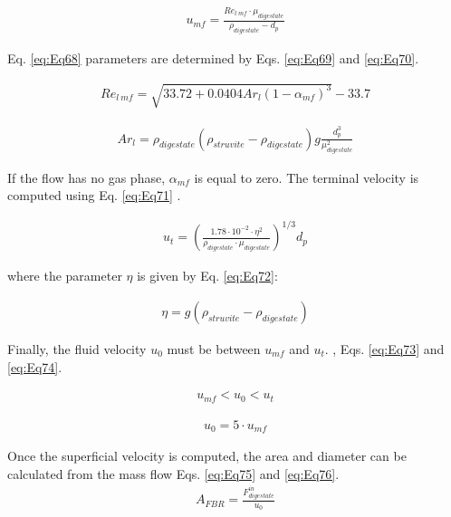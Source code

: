 \begin{refsection}[referencesCh2]
\begin{align}
	{u_{mf}} = \frac{Re_{l \ mf} \cdot {\mu_{digestate}}}{\rho_{digestate} - {d_p}} \label{eq:Eq68}
\end{align}

Eq. \ref{eq:Eq68} parameters are determined by Eqs. \ref{eq:Eq69} and \ref{eq:Eq70}.

\begin{align}
	Re_{l \ mf} = \sqrt {33.72 + 0.0404Ar_{l}{\left( {1 - {\alpha_{mf}}} \right)^3}} - 33.7 \label{eq:Eq69}
\end{align}

\begin{align}
	Ar_{l} = \rho_{digestate} \left( {\rho_{struvite} - {\rho _{digestate}}} \right) g \frac{d_p^3}{\mu_{digestate}^2} \label{eq:Eq70}
\end{align}

If the flow has no gas phase, $\alpha_{mf}$ is equal to zero. The terminal velocity is computed using Eq. \ref{eq:Eq71} \citep{tisa2014basic}.

\begin{align}
	{u_t} = \left( \frac{1.78 \cdot {10}^{ - 2} \cdot {\eta ^2}}{\rho_{digestate} \cdot \mu _{digestate}} \right)^{1/3} {d_p} \label{eq:Eq71}
\end{align}

where the parameter $\eta$ is given by Eq. \ref{eq:Eq72}:

\begin{align}
	\eta  = g\left( {\rho _{struvite} - {\rho _{digestate}}} \right) \label{eq:Eq72}
\end{align}

Finally, the fluid velocity $u_0$ must be between $u_{mf}$ and $u_t$. {}, Eqs. \ref{eq:Eq73} and \ref{eq:Eq74}.

\begin{align}
	{u_{mf}} < {u_0} < {u_t} \label{eq:Eq73}
\end{align}

\begin{align}
	{u_0} = 5 \cdot {u_{mf}} \label{eq:Eq74}
\end{align}

Once the superficial velocity is computed, the area and diameter can be calculated from the mass flow Eqs. \ref{eq:Eq75} and \ref{eq:Eq76}.
\begin{align}
	{A_{FBR}} = \frac{F_{digestate}^{in}}{u_0} \label{eq:Eq75}
\end{align}


\end{refsection}
